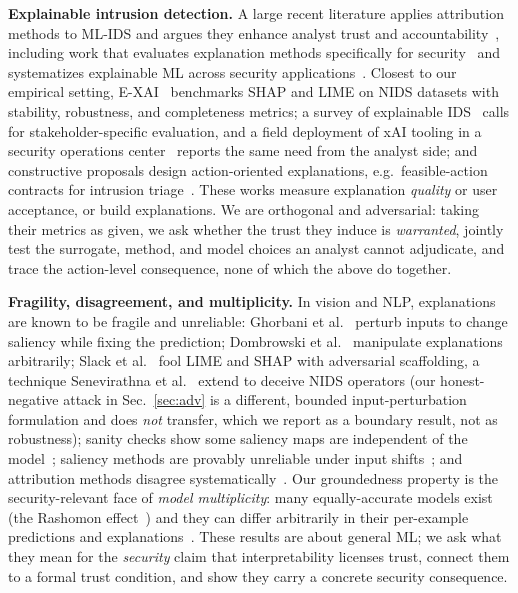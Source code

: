 \documentclass[conference]{IEEEtran}
\begin{document}
\textbf{Explainable intrusion detection.} A large recent literature applies attribution methods
to ML-IDS and argues they enhance analyst trust and accountability~\cite{capuano2022}, including
work that evaluates explanation methods specifically for security~\cite{warnecke2020evaluating}
and systematizes explainable ML across security applications~\cite{nadeem2023sok,ganz2021explaining}.
Closest to our empirical setting, E-XAI~\cite{arreche2024exai} benchmarks SHAP and LIME on NIDS
datasets with stability, robustness, and completeness metrics; a survey of explainable
IDS~\cite{neupane2022xids} calls for stakeholder-specific evaluation, and a field deployment of xAI
tooling in a security operations center~\cite{nyreyu2022xai} reports the same need from the analyst
side; and constructive proposals design action-oriented explanations,
e.g.\ feasible-action contracts for intrusion triage~\cite{action2026}. These works measure
explanation \emph{quality} or user acceptance, or build explanations. We are orthogonal and
adversarial: taking their metrics as given, we ask whether the trust they induce is
\emph{warranted}, jointly test the surrogate, method, and model choices an analyst cannot
adjudicate, and trace the action-level consequence, none of which the above do together.

\textbf{Fragility, disagreement, and multiplicity.} In vision and NLP, explanations are known to
be fragile and unreliable: Ghorbani et al.~\cite{ghorbani2019} perturb inputs to change saliency
while fixing the prediction; Dombrowski et al.~\cite{dombrowski2019} manipulate explanations
arbitrarily; Slack et al.~\cite{slack2020} fool LIME and SHAP with adversarial scaffolding, a technique
Senevirathna et al.~\cite{senevirathna2024} extend to deceive NIDS operators (our honest-negative
attack in Sec.~\ref{sec:adv} is a different, bounded input-perturbation formulation and does
\emph{not} transfer, which we report as a boundary result, not as robustness);
sanity checks show some saliency maps are independent of the model~\cite{adebayo2018sanity};
saliency methods are provably unreliable under input shifts~\cite{kindermans2019unreliability,alvarezmelis2018robustness};
and attribution methods disagree systematically~\cite{krishna2022,hooker2019roar}. Our
groundedness property is the security-relevant face of \emph{model multiplicity}: many
equally-accurate models exist (the Rashomon effect~\cite{breiman2001two,fisher2019rashomon}) and
they can differ arbitrarily in their per-example predictions and
explanations~\cite{marx2020multiplicity,black2022multiplicity}. These results are about general
ML; we ask what they mean for the \emph{security} claim that interpretability licenses trust,
connect them to a formal trust condition, and show they carry a concrete security consequence.
\end{document}
